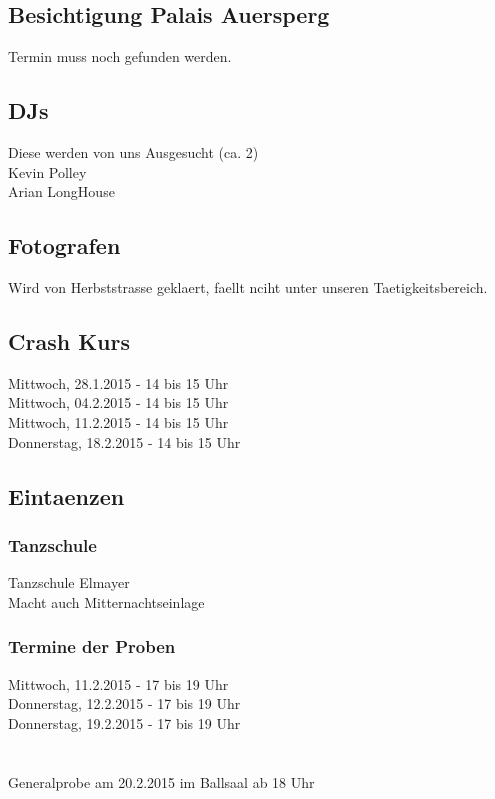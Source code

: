 \documentclass[12pt]{article}
\begin{document}
\subsection{Besichtigung Palais Auersperg}
Termin muss noch gefunden werden. 
\subsection{DJs}
Diese werden von uns Ausgesucht (ca. 2) \\
Kevin Polley \\
Arian LongHouse  \\
\subsection{Fotografen}
Wird von Herbststrasse geklaert, faellt nciht unter unseren Taetigkeitsbereich.
\subsection{Crash Kurs}
Mittwoch, 28.1.2015 - 14 bis 15 Uhr \\ 
Mittwoch, 04.2.2015 - 14 bis 15 Uhr \\ 
Mittwoch, 11.2.2015 - 14 bis 15 Uhr \\
Donnerstag, 18.2.2015 - 14 bis 15 Uhr \\
\subsection{Eintaenzen}
\subsubsection{Tanzschule}
Tanzschule Elmayer \\
Macht auch Mitternachtseinlage
\subsubsection{Termine der Proben}
Mittwoch, 11.2.2015 - 17 bis 19 Uhr \\ 
Donnerstag, 12.2.2015 - 17 bis 19 Uhr \\
Donnerstag, 19.2.2015 - 17 bis 19 Uhr \\
 \\ \\
Generalprobe am 20.2.2015 im Ballsaal ab 18 Uhr
\end{document}

